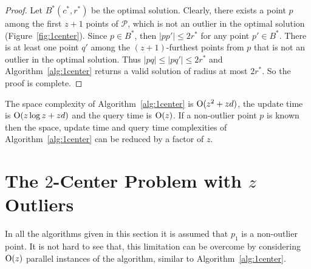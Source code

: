 \documentclass[envcountsame]{cls/cccg15}
\newcommand{\cO}{\ensuremath{{\rm O}}}
\newcommand{\card}[1]{\left|{#1}\right|}
\newcommand{\lee}{\leqslant}
\renewcommand{\le}{\lee}
\begin{document}
\begin{proof}
Let $B^*(c^*, r^*)$ be the optimal solution. Clearly, there exists a point $p$ among the first $z+1$ points of $\mathcal{P}$, which is not an outlier in the optimal solution (Figure~\ref{fig:1center}). Since $p \in B^*$, then $\card{pp'} \le 2r^*$ for any point $p'\in B^*$. There is at least one point $q'$ among the $(z+1)$-furthest points from $p$ that is not an outlier in the optimal solution. Thus $\card{pq} \le \card{pq'} \le 2r^*$ and Algorithm~\ref{alg:1center} returns a valid solution of radius at most $2r^*$. So the proof is complete.
\end{proof}

%


The space complexity of Algorithm~\ref{alg:1center} is $\cO(z^2 + zd)$, the update time is $\cO (z \log z + zd)$ and the query time is $\cO (z)$.
If a non-outlier point $p$ is known then the space, update time and query time complexities of Algorithm~\ref{alg:1center} can be reduced by a factor of $z$.






\section{The $2$-Center Problem with $z$ Outliers}


In all the algorithms given in this section it is assumed that $p_1$ is a non-outlier point. It is not hard to see that, this limitation can be overcome by considering $\cO(z)$ parallel instances of the algorithm, similar to Algorithm~\ref{alg:1center}.
\end{document}
